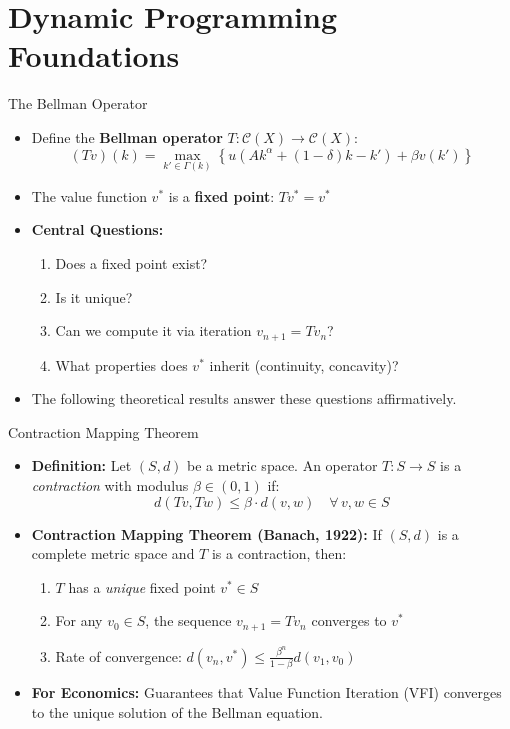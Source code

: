 \documentclass[10pt,english,aspectratio=169]{beamer}
\begin{document}
\section{Dynamic Programming Foundations}

\begin{frame}{The Bellman Operator}
\begin{itemize}
\item Define the \textbf{Bellman operator} $T: \mathcal{C}(X) \to \mathcal{C}(X)$:
\[
(Tv)(k) = \max_{k' \in \Gamma(k)}\left\{ u\left(Ak^{\alpha}+(1-\delta)k - k'\right)+\beta v(k') \right\}
\]

\medskip
\item The value function $v^*$ is a \textbf{fixed point}: $Tv^* = v^*$

\medskip
\item \textbf{Central Questions:}
\begin{enumerate}
    \item Does a fixed point exist?
    \item Is it unique?
    \item Can we compute it via iteration $v_{n+1} = Tv_n$?
    \item What properties does $v^*$ inherit (continuity, concavity)?
\end{enumerate}

\medskip
\item The following theoretical results answer these questions affirmatively.
\end{itemize}
\end{frame}


\begin{frame}{Contraction Mapping Theorem}
\begin{itemize}
\item \textbf{Definition:} Let $(S, d)$ be a metric space. An operator $T: S \to S$ is a \emph{contraction} with modulus $\beta \in (0,1)$ if:
\[
d(Tv, Tw) \leq \beta \cdot d(v, w) \quad \forall\, v, w \in S
\]

\medskip
\item \textbf{Contraction Mapping Theorem (Banach, 1922):} If $(S,d)$ is a complete metric space and $T$ is a contraction, then:
\begin{enumerate}
    \item $T$ has a \emph{unique} fixed point $v^* \in S$
    \item For any $v_0 \in S$, the sequence $v_{n+1} = Tv_n$ converges to $v^*$
    \item Rate of convergence: $d(v_n, v^*) \leq \frac{\beta^n}{1-\beta} d(v_1, v_0)$
\end{enumerate}

\medskip
\item \textbf{For Economics:} Guarantees that Value Function Iteration (VFI) converges to the unique solution of the Bellman equation.
\end{itemize}
\end{frame}
\end{document}
